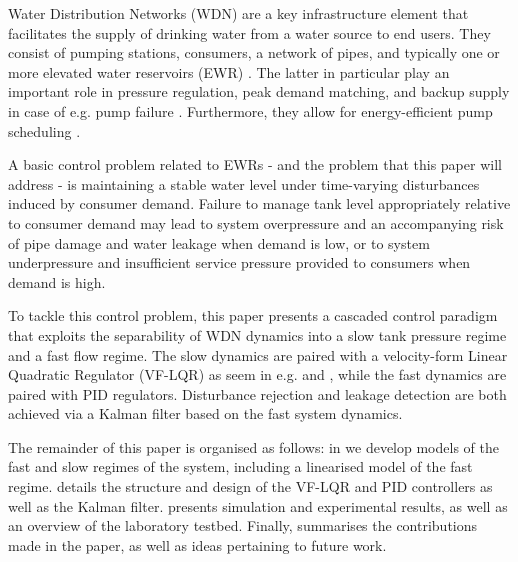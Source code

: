 
Water Distribution Networks (WDN) are a key infrastructure element that facilitates the supply of drinking water from a water source to end users. They consist of pumping stations, consumers, a network of pipes, and typically one or more elevated water reservoirs (EWR) \cite{Swamee2008}. The latter in particular play an important role in pressure regulation, peak demand matching, and backup supply in case of e.g. pump failure \cite{Val2020,Creaco2019}. Furthermore, they allow for energy-efficient pump scheduling \cite{Rathore1030,Bello2019}.  

A basic control problem related to EWRs - and the problem that this paper will address - is maintaining a stable water level under time-varying disturbances induced by consumer demand. Failure to manage tank level appropriately relative to consumer demand may lead to system overpressure and an accompanying risk of pipe damage and water leakage when demand is low, or to system underpressure and insufficient service pressure provided to consumers when demand is high. 

To tackle this control problem, this paper presents a cascaded control paradigm that exploits the separability of WDN dynamics into a slow tank pressure regime and a fast flow regime. The slow dynamics are paired with a velocity-form Linear Quadratic Regulator (VF-LQR) as seem in e.g. \cite{Pannocchia2001,Pannocchia2015a} and \cite{Ruscio2012}, while the fast dynamics are paired with PID regulators. Disturbance rejection and leakage detection are both achieved via a Kalman filter based on the fast system dynamics.

The remainder of this paper is organised as follows: in  we develop models of the fast and slow regimes of the system, including a linearised model of the fast regime.  details the structure and design of the VF-LQR and PID controllers as well as the Kalman filter.  presents simulation and experimental results, as well as an overview of the laboratory testbed. Finally,  summarises the contributions made in the paper, as well as ideas pertaining to future work.